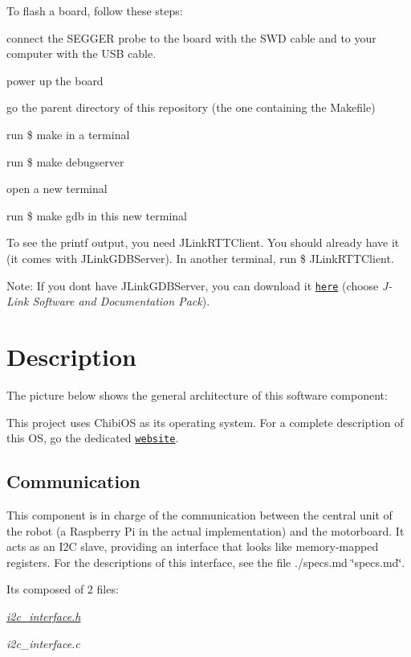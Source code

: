 To flash a board, follow these steps\+:
\begin{DoxyItemize}
\item connect the S\+E\+G\+G\+ER probe to the board with the S\+WD cable and to your computer with the U\+SB cable.
\item power up the board
\item go the parent directory of this repository (the one containing the Makefile)
\item run {\ttfamily \$ make} in a terminal
\item run {\ttfamily \$ make debugserver}
\item open a new terminal
\item run {\ttfamily \$ make gdb} in this new terminal
\end{DoxyItemize}

To see the printf output, you need J\+Link\+R\+T\+T\+Client. You should already have it (it comes with J\+Link\+G\+D\+B\+Server). In another terminal, run {\ttfamily \$ J\+Link\+R\+T\+T\+Client}.

Note\+: If you don\textquotesingle{}t have J\+Link\+G\+D\+B\+Server, you can download it \href{https://www.segger.com/downloads/jlink-beta/}{\tt here} (choose {\itshape J-\/\+Link Software and Documentation Pack}).

\section*{Description}

The picture below shows the general architecture of this software component\+: 

This project uses Chibi\+OS as its operating system. For a complete description of this OS, go the dedicated \href{http://www.chibios.org/dokuwiki/doku.php}{\tt website}.

\subsection*{Communication}

This component is in charge of the communication between the central unit of the robot (a Raspberry Pi in the actual implementation) and the motorboard. It acts as an I2C slave, providing an interface that looks like memory-\/mapped registers. For the descriptions of this interface, see the file ./specs.md \char`\"{}specs.\+md\char`\"{}.

It\textquotesingle{}s composed of 2 files\+:
\begin{DoxyItemize}
\item {\itshape \hyperlink{i2c__interface_8h_source}{i2c\+\_\+interface.\+h}}
\item {\itshape i2c\+\_\+interface.\+c}
\end{DoxyItemize}

